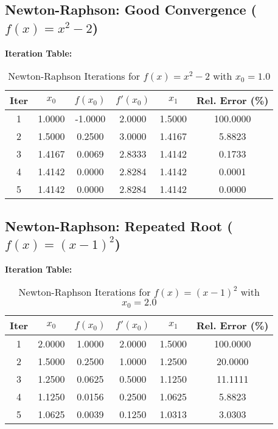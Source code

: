 \documentclass[12pt,a4paper]{article}
\begin{document}
\clearpage

\subsection{Newton-Raphson: Good Convergence ($f(x)=x^2-2$)}
\vspace{1em} %
\noindent\textbf{Iteration Table:}
\begin{table}[H]
\centering
\caption{Newton-Raphson Iterations for $f(x)=x^2-2$ with $x_0=1.0$}
\begin{tabular}{|c|c|c|c|c|c|}
\hline
Iter & $x_0$ & $f(x_0)$ & $f'(x_0)$ & $x_1$ & Rel. Error (\%) \\
\hline
1 & 1.0000 & -1.0000 & 2.0000 & 1.5000 & 100.0000 \\
2 & 1.5000 & 0.2500 & 3.0000 & 1.4167 & 5.8823 \\
3 & 1.4167 & 0.0069 & 2.8333 & 1.4142 & 0.1733 \\
4 & 1.4142 & 0.0000 & 2.8284 & 1.4142 & 0.0001 \\
5 & 1.4142 & 0.0000 & 2.8284 & 1.4142 & 0.0000 \\
\hline
\end{tabular}
\end{table}


\subsection{Newton-Raphson: Repeated Root ($f(x)=(x-1)^2$)}
\vspace{1em}
\noindent\textbf{Iteration Table:}
\begin{table}[H]
\centering
\caption{Newton-Raphson Iterations for $f(x)=(x-1)^2$ with $x_0=2.0$}
\begin{tabular}{|c|c|c|c|c|c|}
\hline
Iter & $x_0$ & $f(x_0)$ & $f'(x_0)$ & $x_1$ & Rel. Error (\%) \\
\hline
1 & 2.0000 & 1.0000 & 2.0000 & 1.5000 & 100.0000 \\
2 & 1.5000 & 0.2500 & 1.0000 & 1.2500 & 20.0000 \\
3 & 1.2500 & 0.0625 & 0.5000 & 1.1250 & 11.1111 \\
4 & 1.1250 & 0.0156 & 0.2500 & 1.0625 & 5.8823 \\
5 & 1.0625 & 0.0039 & 0.1250 & 1.0313 & 3.0303 \\
\hline
\end{tabular}
\end{table}
\end{document}
